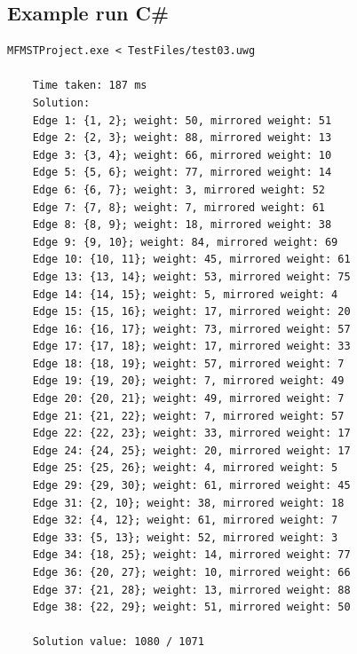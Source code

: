 \documentclass[12pt]{report}
\begin{document}
\subsection{Example run C\#}
\begin{lstlisting}[basicstyle=\footnotesize]
	MFMSTProject.exe < TestFiles/test03.uwg
	
	Time taken: 187 ms
	Solution:
	Edge 1: {1, 2}; weight: 50, mirrored weight: 51
	Edge 2: {2, 3}; weight: 88, mirrored weight: 13
	Edge 3: {3, 4}; weight: 66, mirrored weight: 10
	Edge 5: {5, 6}; weight: 77, mirrored weight: 14
	Edge 6: {6, 7}; weight: 3, mirrored weight: 52
	Edge 7: {7, 8}; weight: 7, mirrored weight: 61
	Edge 8: {8, 9}; weight: 18, mirrored weight: 38
	Edge 9: {9, 10}; weight: 84, mirrored weight: 69
	Edge 10: {10, 11}; weight: 45, mirrored weight: 61
	Edge 13: {13, 14}; weight: 53, mirrored weight: 75
	Edge 14: {14, 15}; weight: 5, mirrored weight: 4
	Edge 15: {15, 16}; weight: 17, mirrored weight: 20
	Edge 16: {16, 17}; weight: 73, mirrored weight: 57
	Edge 17: {17, 18}; weight: 17, mirrored weight: 33
	Edge 18: {18, 19}; weight: 57, mirrored weight: 7
	Edge 19: {19, 20}; weight: 7, mirrored weight: 49
	Edge 20: {20, 21}; weight: 49, mirrored weight: 7
	Edge 21: {21, 22}; weight: 7, mirrored weight: 57
	Edge 22: {22, 23}; weight: 33, mirrored weight: 17
	Edge 24: {24, 25}; weight: 20, mirrored weight: 17
	Edge 25: {25, 26}; weight: 4, mirrored weight: 5
	Edge 29: {29, 30}; weight: 61, mirrored weight: 45
	Edge 31: {2, 10}; weight: 38, mirrored weight: 18
	Edge 32: {4, 12}; weight: 61, mirrored weight: 7
	Edge 33: {5, 13}; weight: 52, mirrored weight: 3
	Edge 34: {18, 25}; weight: 14, mirrored weight: 77
	Edge 36: {20, 27}; weight: 10, mirrored weight: 66
	Edge 37: {21, 28}; weight: 13, mirrored weight: 88
	Edge 38: {22, 29}; weight: 51, mirrored weight: 50
	
	Solution value: 1080 / 1071
\end{lstlisting}

\newpage
\end{document}
